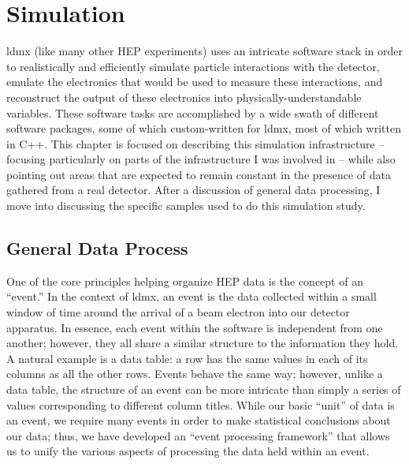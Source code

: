 \chapter{Simulation}
\label{chapter:ldmx:simulation}

\ac{ldmx} (like many other HEP experiments) uses an intricate software stack in order to realistically and efficiently simulate particle interactions with the detector, emulate the electronics that would be used to measure these interactions, and reconstruct the output of these electronics into physically-understandable variables.
These software tasks are accomplished by a wide swath of different software packages, some of which custom-written for \ac{ldmx}, most of which written in C++.
This chapter is focused on describing this simulation infrastructure -- focusing particularly on parts of the infrastructure I was involved in -- while also pointing out areas that are expected to remain constant in the presence of data gathered from a real detector.
After a discussion of general data processing, I move into discussing the specific samples
used to do this simulation study.

\section{General Data Process}
One of the core principles helping organize HEP data is the concept of an ``event.'' In the context
of \ac{ldmx}, an event is the data collected within a small window of time around the arrival of a
beam electron into our detector apparatus. In essence, each event within the software is
independent from one another; however, they all share a similar structure to the information they
hold. A natural example is a data table: a row has the same values in each of its columns as all
the other rows. Events behave the same way; however, unlike a data table, the structure of an event
can be more intricate than simply a series of values corresponding to different column titles.
While our basic ``unit'' of data is an event, we require many events in order to make statistical
conclusions about our data; thus, we have developed an ``event processing framework'' that allows
us to unify the various aspects of processing the data held within an event.

